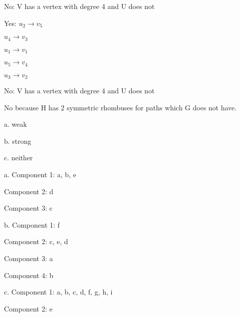 \documentclass[12pt]{article}
\newenvironment{problem}[2][Problem]{\begin{trivlist}
\item[\hskip \labelsep {\bfseries #1}\hskip \labelsep {\bfseries #2.}]}{\end{trivlist}}
\begin{document}
\begin{problem}{10.3.36}
\end{problem}

No: V has a vertex with degree 4 and U does not

\begin{problem}{10.3.38}
\end{problem}

Yes: $u_2 \rightarrow v_5$

$u_4 \rightarrow v_3$

$u_1 \rightarrow v_1$

$u_5 \rightarrow v_4$

$u_3 \rightarrow v_2$

\begin{problem}{10.3.40}
\end{problem}

No: V has a vertex with degree 4 and U does not

\begin{problem}{10.4.22}
\end{problem}

No because H has 2 symmetric rhombuses for paths which G does not have.

\begin{problem}{10.4.12}
\end{problem}

a. weak

b. strong

c. neither 

\begin{problem}{10.4.14}
\end{problem}

a. Component 1: a, b, e 

Component 2: d 

Component 3: c

b. Component 1: f

Component 2: c, e, d

Component 3: a

Component 4: b

c. Component 1: a, b, c, d, f, g, h, i

Component 2: e

\begin{problem}{10.4.50}
\end{problem}
\end{document}
